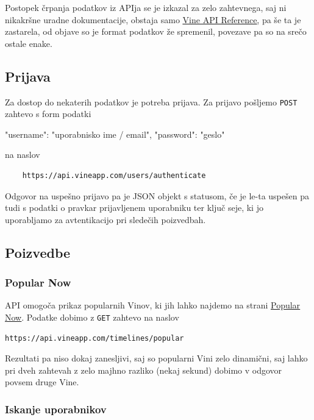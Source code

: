 \documentclass[a4paper,11pt]{article}
\begin{document}
Postopek črpanja podatkov iz APIja se je izkazal za zelo zahtevnega, saj ni
nikakršne uradne dokumentacije, obstaja samo
\href{https://github.com/starlock/vino/wiki/API-Reference}{\underline{Vine API
Reference}}, pa še ta je zastarela, od objave so je format podatkov že
spremenil, povezave pa so na srečo ostale enake.

\subsection{Prijava}

Za dostop do nekaterih podatkov je potreba prijava. Za prijavo pošljemo
\texttt{POST} zahtevo s form podatki

\begin{jsoncode}
    {
        "username": "uporabnisko ime / email",
        "password": "geslo"
    }
\end{jsoncode}

na naslov

\begin{lstlisting}
    https://api.vineapp.com/users/authenticate
\end{lstlisting}

Odgovor na uspešno prijavo pa je JSON objekt s statusom, če je le-ta uspešen pa tudi s podatki o pravkar prijavljenem uporabniku ter ključ seje, ki jo uporabljamo za avtentikacijo pri sledečih poizvedbah.

\subsection{Poizvedbe}

\subsubsection{Popular Now}

API omogoča prikaz popularnih Vinov, ki jih lahko najdemo na strani \href{https://vine.co/popular-now}{\underline{Popular Now}}. Podatke dobimo z \texttt{GET} zahtevo na naslov

\begin{lstlisting}
https://api.vineapp.com/timelines/popular
\end{lstlisting}

\noindent
Rezultati pa niso dokaj zanesljivi, saj so popularni Vini zelo dinamični, saj lahko pri dveh zahtevah z zelo majhno razliko (nekaj sekund) dobimo v odgovor povsem druge Vine.

\subsubsection{Iskanje uporabnikov}
\end{document}
